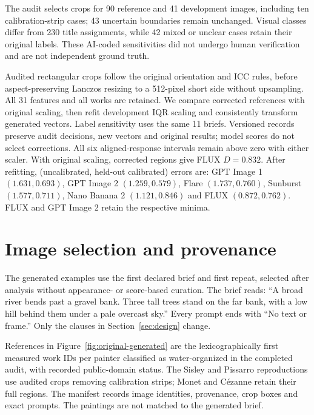 The audit selects crops for 90 reference and 41 development images, including
ten calibration-strip cases; 43 uncertain boundaries remain unchanged. Visual
classes differ from 230 title assignments, while 42 mixed or unclear cases
retain their original labels. These AI-coded sensitivities did not undergo human verification and are not
independent ground truth.

Audited rectangular crops follow the original orientation and ICC rules, before
aspect-preserving Lanczos resizing to a 512-pixel short side without upsampling.
All 31 features and all works are retained. We compare corrected references with
original scaling, then refit development IQR scaling and consistently transform
generated vectors. Label sensitivity uses the same 11 briefs. Versioned records
preserve audit decisions, new vectors and original results; model scores do not
select corrections.
All six aligned-response intervals remain above zero with either scaler.
With original scaling, corrected regions give FLUX $D=0.832$.
After refitting, (uncalibrated, held-out calibrated) errors are:
GPT Image 1 $(1.631,0.693)$, GPT Image 2 $(1.259,0.579)$,
Flare $(1.737,0.760)$, Sunburst $(1.577,0.711)$, Nano Banana 2 $(1.121,0.846)$
and FLUX $(0.872,0.762)$. FLUX and GPT Image 2 retain the respective minima.

\section{Image selection and provenance}\label{app:images}
The generated examples use the first declared brief and first repeat, selected
after analysis without appearance- or score-based curation. The brief reads:
``A broad river bends past a gravel bank. Three tall trees stand on the far bank,
with a low hill behind them under a pale overcast sky.'' Every prompt ends with
``No text or frame.'' Only the clauses in Section~\ref{sec:design} change.

References in Figure~\ref{fig:original-generated} are the lexicographically first
measured work IDs per painter classified as water-organized in the completed
audit, with recorded public-domain status. The Sisley and Pissarro reproductions
use audited crops removing calibration strips; Monet and C\'ezanne retain their
full regions. The manifest records image identities, provenance, crop boxes
and exact prompts. The paintings are not matched to the generated brief.


\FloatBarrier
